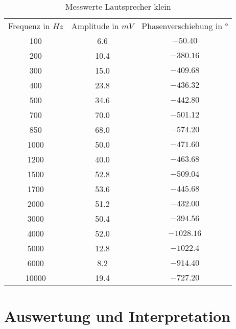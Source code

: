 \begin{table}[H]
\centering
\begin{tabular}{ccc}
  Frequenz in $Hz$ & Amplitude in $mV$ &  Phasenverschiebung in $°$ \\
  100 &  6.6& $-50.40$ \\
  200 & 10.4 & $-380.16$ \\
  300 & 15.0 & $-409.68$ \\
  400 & 23.8 & $-436.32$ \\
  500 & 34.6 & $-442.80$ \\
  700 & 70.0 & $-501.12$ \\
  850 & 68.0 & $-574.20$ \\
  1000 & 50.0 & $-471.60$ \\
  1200 & 40.0 & $-463.68$ \\
  1500 & 52.8 & $-509.04$ \\
  1700 & 53.6 & $-445.68$ \\
  2000 & 51.2 & $-432.00$ \\
  3000 & 50.4 & $-394.56$ \\
  4000 & 52.0 & $-1028.16$ \\
  5000 & 12.8 & $-1022.4$ \\
  6000 & 8.2 & $-914.40$ \\
  10000 & 19.4 & $-727.20$ \\
 \end{tabular}
\label{tab:MLk}
\caption{Messwerte Lautsprecher klein}
\end{table}
\label{chap:VERSUCH_2_MESSWERTE}

\section{Auswertung und Interpretation}
